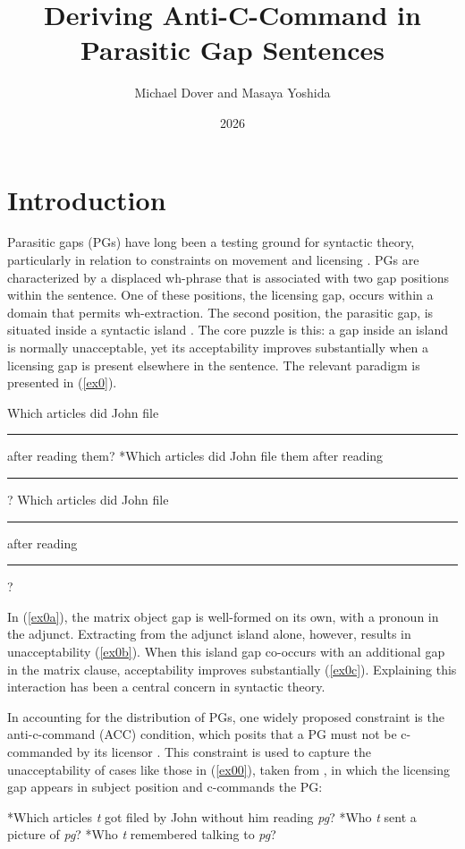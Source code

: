 \documentclass[12pt]{article}
\title{Deriving Anti-C-Command in Parasitic Gap Sentences}
\author{Michael Dover and Masaya Yoshida}
\date{2026}
\newcommand{\gap}{\rule{1.25em}{.5pt}} %
\begin{document}
\maketitle

\section{Introduction}

Parasitic gaps (PGs) have long been a testing ground for syntactic theory, particularly in relation to constraints on movement and licensing \citep{culicover2000, culicover2001}. PGs are characterized by a displaced wh-phrase that is associated with two gap positions within the sentence. One of these positions, the licensing gap, occurs within a domain that permits wh-extraction. The second position, the parasitic gap, is situated inside a syntactic island \citep{ross1967}. The core puzzle is this: a gap inside an island is normally unacceptable, yet its acceptability improves substantially when a licensing gap is present elsewhere in the sentence. The relevant paradigm is presented in (\ref{ex0}).

\pex \label{ex0}
\a \label{ex0a} Which articles did John file \gap{} after reading them?
\a \label{ex0b} *Which articles did John file them after reading \gap{}?
\a \label{ex0c} Which articles did John file \gap{} after reading \gap{}?
\xe

In (\ref{ex0a}), the matrix object gap is well-formed on its own, with a pronoun in the adjunct. Extracting from the adjunct island alone, however, results in unacceptability (\ref{ex0b}). When this island gap co-occurs with an additional gap in the matrix clause, acceptability improves substantially (\ref{ex0c}). Explaining this interaction has been a central concern in syntactic theory.

In accounting for the distribution of PGs, one widely proposed constraint is the anti-c-command (ACC) condition, which posits that a PG must not be c-commanded by its licensor \citep{engdahl1983}. This constraint is used to capture the unacceptability of cases like those in (\ref{ex00}), taken from \citet{engdahl1983}, in which the licensing gap appears in subject position and c-commands the PG:

\pex \label{ex00}
\a \label{ex00a} *Which articles \emph{t} got filed by John without him reading \emph{pg}?
\a \label{ex00b} *Who \emph{t} sent a picture of \emph{pg}?
\a \label{ex00c} *Who \emph{t} remembered talking to \emph{pg}? 
\xe
\end{document}

